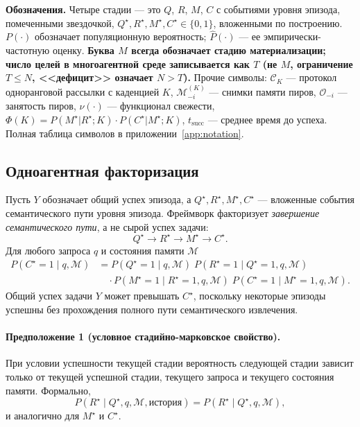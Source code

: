 \documentclass{article}
\begin{document}
\textbf{Обозначения.} Четыре стадии --- это $Q$, $R$, $M$, $C$ с событиями уровня эпизода, помеченными звездочкой, $Q^\star,R^\star,M^\star,C^\star\!\in\!\{0,1\}$, вложенными по построению. $P(\cdot)$ обозначает популяционную вероятность; $\hat{P}(\cdot)$ --- ее эмпирически-частотную оценку. \textbf{Буква $M$ всегда обозначает стадию материализации; число целей в многоагентной среде записывается как $T$ (не $M$, ограничение $T{\le}N$, <<дефицит>> означает $N{>}T$).} Прочие символы: $\mathcal{C}_K$ --- протокол одноранговой рассылки с каденцией $K$, $\mathcal{M}_{-i}^{(K)}$ --- снимки памяти пиров, $\mathcal{O}_{-i}$ --- занятость пиров, $\nu(\cdot)$ --- функционал свежести, $\Phi(K){=}P(M^\star|R^\star;K)\!\cdot\!P(C^\star|M^\star;K)$, $t_{\mathrm{succ}}$ --- среднее время до успеха. Полная таблица символов в приложении~\ref{app:notation}.

\subsection{Одноагентная факторизация}
\label{sec:single-theory}

Пусть $Y$ обозначает общий успех эпизода, а
$Q^\star, R^\star, M^\star, C^\star$ --- вложенные события семантического
пути уровня эпизода. Фреймворк факторизует \emph{завершение семантического
пути}, а не сырой успех задачи:
\[
Q^\star \rightarrow R^\star \rightarrow M^\star \rightarrow C^\star.
\]
Для любого запроса $q$ и состояния памяти $\mathcal{M}$
\begin{align*}
P(C^\star = 1 \mid q, \mathcal{M})
&=
P(Q^\star = 1 \mid q, \mathcal{M})\;
P(R^\star = 1 \mid Q^\star = 1, q, \mathcal{M}) \\
&\quad \cdot
P(M^\star = 1 \mid R^\star = 1, q, \mathcal{M})\;
P(C^\star = 1 \mid M^\star = 1, q, \mathcal{M}).
\end{align*}
Общий успех задачи $Y$ может превышать $C^\star$, поскольку некоторые эпизоды
успешны без прохождения полного пути семантического извлечения.

\paragraph{Предположение 1 (условное стадийно-марковское свойство).}
При условии успешности текущей стадии вероятность
следующей стадии зависит только от текущей успешной стадии,
текущего запроса и текущего состояния памяти. Формально,
\[
P(R^\star \mid Q^\star, q, \mathcal{M}, \text{история}) = P(R^\star \mid Q^\star, q, \mathcal{M}),
\]
и аналогично для $M^\star$ и $C^\star$.
\end{document}

